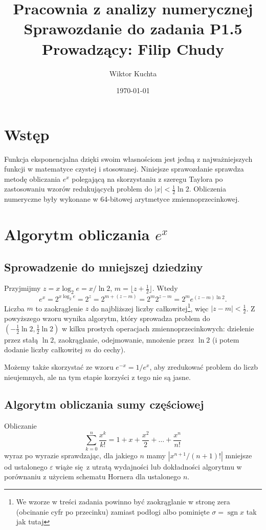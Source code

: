 \documentclass[a4paper, 12pt]{article}
\date{\today}
\title{
	\LARGE \textbf{Pracownia z analizy numerycznej} \\
	\Large Sprawozdanie do zadania P1.5 \\
	\large Prowadzący: Filip Chudy}
\author{Wiktor Kuchta}
\DeclareMathOperator{\sgn}{sgn}
\begin{document}
\maketitle

\section{Wstęp}
Funkcja eksponencjalna dzięki swoim własnościom jest jedną z najważniejszych
funkcji w matematyce czystej i stosowanej.
Niniejsze sprawozdanie sprawdza metodę obliczania $e^x$ polegającą na
skorzystaniu z szeregu Taylora po zastosowaniu wzorów redukujących problem
do $|x| < \frac{1}{2}\ln 2$.
Obliczenia numeryczne były wykonane w 64-bitowej arytmetyce zmiennoprzecinkowej.

\section{Algorytm obliczania $e^x$}
\subsection{Sprowadzenie do mniejszej dziedziny}
Przyjmijmy $z = x\log_2 e = x / \ln 2$, $m = \lfloor z + \frac{1}{2} \rfloor$.
Wtedy
$$e^x =
2^{x\log_2 e} = 2^z = 2^{m + (z-m)} = 2^m 2^{z-m} = 2^m e^{(z-m)\ln 2}.$$
Liczba $m$ to zaokrąglenie
$z$ do najbliższej liczby całkowitej\footnote{
We wzorze w treści zadania powinno być zaokrąglanie w stronę zera
(obcinanie cyfr po przecinku) zamiast podłogi
albo pominięte $\sigma = \sgn x$ tak jak tutaj
}, więc $|z-m| < \frac{1}{2}$.
Z powyższego wzoru wynika algorytm, który sprowadza problem do
$(-\frac{1}{2}\ln 2, \frac{1}{2}\ln 2)$
w kilku prostych operacjach zmiennoprzecinkowych:
dzielenie przez stałą $\ln 2$, zaokrąglanie, odejmowanie, mnożenie przez
$\ln 2$ (i potem dodanie liczby całkowitej $m$ do cechy).

Możemy także skorzystać ze wzoru $e^{-x} = 1/e^x$, aby zredukować problem do
liczb nieujemnych, ale na tym etapie korzyści z tego nie są jasne.

\subsection{Algorytm obliczania sumy częściowej}

Obliczanie
$$
\sum_{k=0}^n \frac{x^k}{k!} = 1 + x + \frac{x^2}{2} + \dots + \frac{x^n}{n!}
$$
wyraz po wyrazie
sprawdzając, dla jakiego $n$ mamy $|x^{n+1}/(n+1)!|$ mniejsze od ustalonego
$\varepsilon$ wiąże się z utratą wydajności lub
dokładności algorytmu w porównaniu z użyciem schematu Hornera dla
ustalonego $n$.
\end{document}
